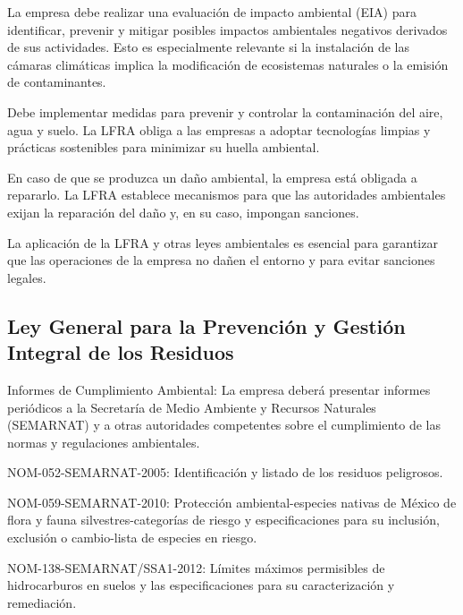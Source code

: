 La empresa debe realizar una evaluación de impacto ambiental (EIA) para identificar, prevenir y mitigar posibles impactos ambientales negativos derivados de sus actividades. Esto es especialmente relevante si la instalación de las cámaras climáticas implica la modificación de ecosistemas naturales o la emisión de contaminantes.

Debe implementar medidas para prevenir y controlar la contaminación del aire, agua y suelo. La LFRA obliga a las empresas a adoptar tecnologías limpias y prácticas sostenibles para minimizar su huella ambiental.

En caso de que se produzca un daño ambiental, la empresa está obligada a repararlo. La LFRA establece mecanismos para que las autoridades ambientales exijan la reparación del daño y, en su caso, impongan sanciones.

La aplicación de la LFRA y otras leyes ambientales es esencial para garantizar que las operaciones de la empresa no dañen el entorno y para evitar sanciones legales.

\subsection{Ley General para la Prevención y Gestión Integral de los Residuos}

Informes de Cumplimiento Ambiental: La empresa deberá presentar informes periódicos a la Secretaría de Medio Ambiente y Recursos Naturales (SEMARNAT) y a otras autoridades competentes sobre el cumplimiento de las normas y regulaciones ambientales.

NOM-052-SEMARNAT-2005: Identificación y listado de los residuos peligrosos.

NOM-059-SEMARNAT-2010: Protección ambiental-especies nativas de México de flora y fauna silvestres-categorías de riesgo y especificaciones para su inclusión, exclusión o cambio-lista de especies en riesgo.

NOM-138-SEMARNAT/SSA1-2012: Límites máximos permisibles de hidrocarburos en suelos y las especificaciones para su caracterización y remediación.
